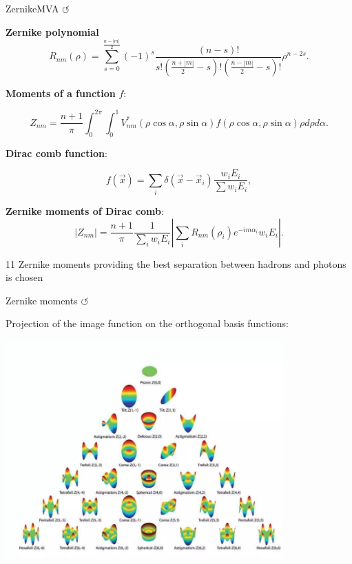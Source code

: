 \documentclass[xcolor=dvipsnames]{beamer}
\begin{document}
\begin{frame}{ZernikeMVA \hyperlink{frame:A}{$\circlearrowleft$}}
   \scriptsize\centering

   \textbf{Zernike polynomial}
   \begin{equation*}
      R_{nm}(\rho) = \sum^{\frac{n-|m|}{2}}_{s=0}(-1)^s \frac{(n-s)!}{ s! \left(\frac{n+|m|}{2}-s \right) ! \left( \frac{n-|m|}{2}-s\right) !}\rho^{n-2s}.
  \end{equation*}

  \textbf{Moments of a function} \bm $f$:

  \begin{equation*}
   Z_{nm} = \frac{n+1}{\pi} \int_0^{2\pi}\int^1_0 V^*_{nm}(\rho\cos\alpha,\rho\sin\alpha)f(\rho\cos\alpha, \rho\sin\alpha)\rho d\rho d\alpha.
\end{equation*}

\textbf{Dirac comb function}:


\begin{equation*}
   f(\vec{x}) = \sum_i \delta(\vec{x}-\vec{x}_i)\frac{w_iE_i}{\sum w_iE_i},
\end{equation*}

   \textbf{Zernike moments of Dirac comb}:
   \begin{equation*}
      |Z_{nm}| = \frac{n+1}{\pi}\frac{1}{\sum_iw_iE_i}\left|\sum_iR_{nm}(\rho_i)e^{-im\alpha_i}w_iE_i\right|.
  \end{equation*}

11 Zernike moments providing the best separation between hadrons and photons is chosen

  
\end{frame}

\begin{frame}{Zernike moments \hyperlink{frame:A}{$\circlearrowleft$}}
   \centering

   Projection of the image function on the orthogonal basis functions:

   \includegraphics[width=0.8\textwidth]{figures/zmva_projection.png}
\end{frame}
\end{document}
